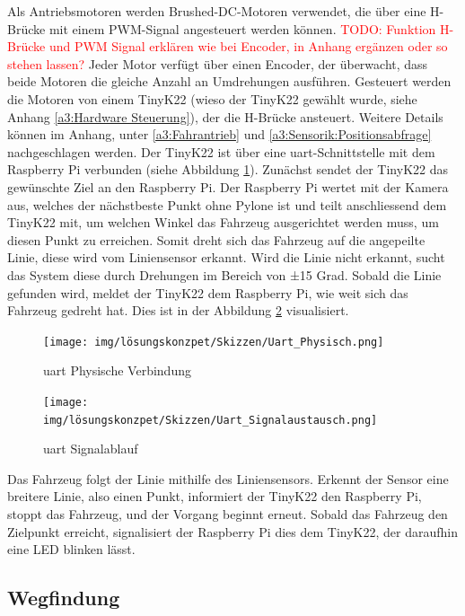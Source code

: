 \documentclass[../main.tex]{subfiles}
\begin{document}
Als Antriebsmotoren werden Brushed-DC-Motoren verwendet, die über eine H-Brücke mit einem PWM-Signal angesteuert werden können. \textcolor{red}{TODO: Funktion H-Brücke und PWM Signal erklären wie bei Encoder, in Anhang ergänzen oder so stehen lassen?} Jeder Motor verfügt über einen Encoder, der überwacht, dass beide Motoren die gleiche Anzahl an Umdrehungen ausführen. Gesteuert werden die Motoren von einem TinyK22 (wieso der TinyK22 gewählt wurde, siehe Anhang \ref{a3:Hardware Steuerung}), der die H-Brücke ansteuert. Weitere Details können im Anhang, unter \ref{a3:Fahrantrieb} und \ref{a3:Sensorik:Positionsabfrage} nachgeschlagen werden.
\newpage
Der TinyK22 ist über eine \Gls{uart}-Schnittstelle mit dem Raspberry Pi verbunden (siehe Abbildung \ref{img:UART_Physisch}). Zunächst sendet der TinyK22 das gewünschte Ziel an den Raspberry Pi. Der Raspberry Pi wertet mit der Kamera aus, welches der nächstbeste Punkt ohne Pylone ist und teilt anschliessend dem TinyK22 mit, um welchen Winkel das Fahrzeug ausgerichtet werden muss, um diesen Punkt zu erreichen. Somit dreht sich das Fahrzeug auf die angepeilte Linie, diese wird vom Liniensensor erkannt. Wird die Linie nicht erkannt, sucht das System diese durch Drehungen im Bereich von ±15 Grad. Sobald die Linie gefunden wird, meldet der TinyK22 dem Raspberry Pi, wie weit sich das Fahrzeug gedreht hat. Dies ist in der Abbildung \ref{img:UART_Signalablauf} visualisiert.

\begin{figure}[H]
\centering
\texttt{[image: img/lösungskonzpet/Skizzen/Uart\_Physisch.png]}
\caption{\Gls{uart} Physische Verbindung}
\label{img:UART_Physisch}
\end{figure}

\begin{figure}[H]
\centering
\texttt{[image: img/lösungskonzpet/Skizzen/Uart\_Signalaustausch.png]}
\caption{\Gls{uart} Signalablauf}
\label{img:UART_Signalablauf}
\end{figure}


Das Fahrzeug folgt der Linie mithilfe des Liniensensors. Erkennt der Sensor eine breitere Linie, also einen Punkt, informiert der TinyK22 den Raspberry Pi, stoppt das Fahrzeug, und der Vorgang beginnt erneut. Sobald das Fahrzeug den Zielpunkt erreicht, signalisiert der Raspberry Pi dies dem TinyK22, der daraufhin eine LED blinken lässt.

\newpage

\subsection{Wegfindung}
\end{document}
